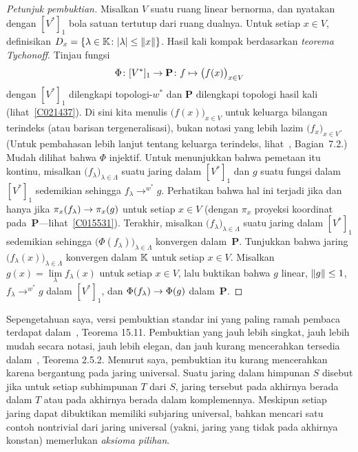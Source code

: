 \begin{proof}[\emph{Petunjuk pembuktian}] Misalkan $V$ suatu ruang linear bernorma, dan nyatakan dengan $[V^*]_1$ bola satuan tertutup dari
ruang dualnya.  Untuk setiap $x \in V$, definisikan $D_x = \{\lambda \in \mathbb{K} \colon \lvert\lambda\rvert \le \lVert x\rVert\}$.  Hasil kali
 kompak berdasarkan \emph{teorema Tychonoff}.  Tinjau fungsi
   \[ \Phi\colon [V^*]_1 \rightarrow \mathbf P \colon f \mapsto \bigl(f(x)\bigr)_{x \in V} \]
dengan $[V^*]_1$ dilengkapi topologi-$w^*$ dan $\mathbf P$ dilengkapi topologi hasil kali (lihat~\ref{C021437}).  Di sini kita menulis
$\bigl(f(x)\bigr)_{x \in V}$ untuk keluarga bilangan terindeks (atau barisan tergeneralisasi), bukan notasi yang lebih lazim
$\bigl(f_x\bigr)_{x \in V}$.  (Untuk pembahasan lebih lanjut tentang keluarga terindeks, lihat~\cite{Erdman:2007}, Bagian~7.2.)  Mudah dilihat bahwa
$\Phi$ injektif.  Untuk menunjukkan bahwa pemetaan itu kontinu, misalkan $\bigl(f_\lambda\bigr)_{\lambda \in \Lambda}$ suatu jaring dalam $[V^*]_1$
dan $g$ suatu fungsi dalam $[V^*]_1$ sedemikian sehingga $f_\lambda \to^{w^*} g$.  Perhatikan bahwa hal ini terjadi jika dan hanya jika
$\pi_x(f_\lambda) \rightarrow \pi_x(g)$ untuk setiap $x \in V$ (dengan $\pi_x$ proyeksi koordinat pada~$\mathbf P$---lihat~\ref{C015531}).
Terakhir, misalkan $\bigl(f_\lambda\bigr)_{\lambda \in \Lambda}$ suatu jaring dalam $[V^*]_1$ sedemikian sehingga $\bigl(\Phi(f_\lambda)\bigr)_{\lambda \in \Lambda}$
konvergen dalam~$\mathbf P$.  Tunjukkan bahwa jaring $\bigl(f_\lambda(x)\bigr)_{\lambda \in \Lambda}$ konvergen dalam $\mathbb{K}$ untuk setiap $x \in V$.
Misalkan $g(x) = \lim\limits_\lambda f_\lambda(x)$ untuk setiap $x \in V$, lalu buktikan bahwa $g$ linear, $\lVert g\rVert \le 1$,
$f_\lambda \to^{w^*} g$ dalam $[V^*]_1$, dan $\Phi(f_\lambda) \rightarrow \Phi(g)$ dalam~$\mathbf P$.  \ns
\end{proof}

Sepengetahuan saya, versi pembuktian standar ini yang paling ramah pembaca terdapat dalam~\cite{BrownP:1977}, Teorema 15.11.
Pembuktian yang jauh lebih singkat, jauh lebih mudah secara notasi, jauh lebih elegan, dan jauh kurang mencerahkan tersedia dalam~\cite{Pedersen:1995}, Teorema 2.5.2.
Menurut saya, pembuktian itu kurang mencerahkan karena bergantung pada jaring universal.  Suatu jaring dalam himpunan $S$ disebut
 jika untuk setiap subhimpunan $T$ dari $S$, jaring tersebut pada akhirnya berada dalam $T$ atau pada akhirnya berada dalam komplemennya. Meskipun
setiap jaring dapat dibuktikan memiliki subjaring universal, bahkan mencari satu contoh nontrivial dari jaring universal (yakni, jaring yang tidak
pada akhirnya konstan) memerlukan \emph{aksioma pilihan}.






